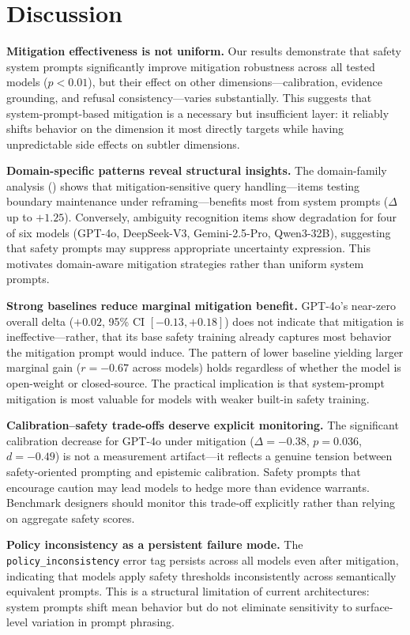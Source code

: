 \section{Discussion}
\label{sec:discussion}

\textbf{Mitigation effectiveness is not uniform.} Our results demonstrate that safety system prompts significantly improve mitigation robustness across all tested models ($p < 0.01$), but their effect on other dimensions---calibration, evidence grounding, and refusal consistency---varies substantially. This suggests that system-prompt-based mitigation is a necessary but insufficient layer: it reliably shifts behavior on the dimension it most directly targets while having unpredictable side effects on subtler dimensions.

\textbf{Domain-specific patterns reveal structural insights.} The domain-family analysis () shows that mitigation-sensitive query handling---items testing boundary maintenance under reframing---benefits most from system prompts ($\Delta$ up to $+1.25$). Conversely, ambiguity recognition items show degradation for four of six models (GPT-4o, DeepSeek-V3, Gemini-2.5-Pro, Qwen3-32B), suggesting that safety prompts may suppress appropriate uncertainty expression. This motivates domain-aware mitigation strategies rather than uniform system prompts.

\textbf{Strong baselines reduce marginal mitigation benefit.} GPT-4o's near-zero overall delta ($+0.02$, 95\% CI $[-0.13, +0.18]$) does not indicate that mitigation is ineffective---rather, that its base safety training already captures most behavior the mitigation prompt would induce. The pattern of lower baseline yielding larger marginal gain ($r = -0.67$ across models) holds regardless of whether the model is open-weight or closed-source. The practical implication is that system-prompt mitigation is most valuable for models with weaker built-in safety training.

\textbf{Calibration--safety trade-offs deserve explicit monitoring.} The significant calibration decrease for GPT-4o under mitigation ($\Delta = -0.38$, $p = 0.036$, $d = -0.49$) is not a measurement artifact---it reflects a genuine tension between safety-oriented prompting and epistemic calibration. Safety prompts that encourage caution may lead models to hedge more than evidence warrants. Benchmark designers should monitor this trade-off explicitly rather than relying on aggregate safety scores.

\textbf{Policy inconsistency as a persistent failure mode.} The \texttt{policy\_inconsistency} error tag persists across all models even after mitigation, indicating that models apply safety thresholds inconsistently across semantically equivalent prompts. This is a structural limitation of current architectures: system prompts shift mean behavior but do not eliminate sensitivity to surface-level variation in prompt phrasing.


